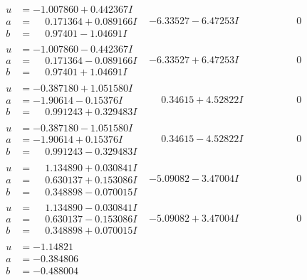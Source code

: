 \documentclass[1p]{elsarticle_modified}
\theoremstyle{definition}
\begin{document}
$$\begin{array}{c|c|c}
\begin{aligned}
u &= -1.007860 + 0.442367 I \\
a &= \phantom{-}0.171364 + 0.089166 I \\
b &= \phantom{-}0.97401 - 1.04691 I\end{aligned}
 & -6.33527 - 6.47253 I & \phantom{-0.000000 } 0 \\ \hline\begin{aligned}
u &= -1.007860 - 0.442367 I \\
a &= \phantom{-}0.171364 - 0.089166 I \\
b &= \phantom{-}0.97401 + 1.04691 I\end{aligned}
 & -6.33527 + 6.47253 I & \phantom{-0.000000 } 0 \\ \hline\begin{aligned}
u &= -0.387180 + 1.051580 I \\
a &= -1.90614 - 0.15376 I \\
b &= \phantom{-}0.991243 + 0.329483 I\end{aligned}
 & \phantom{-}0.34615 + 4.52822 I & \phantom{-0.000000 } 0 \\ \hline\begin{aligned}
u &= -0.387180 - 1.051580 I \\
a &= -1.90614 + 0.15376 I \\
b &= \phantom{-}0.991243 - 0.329483 I\end{aligned}
 & \phantom{-}0.34615 - 4.52822 I & \phantom{-0.000000 } 0 \\ \hline\begin{aligned}
u &= \phantom{-}1.134890 + 0.030841 I \\
a &= \phantom{-}0.630137 + 0.153086 I \\
b &= \phantom{-}0.348898 - 0.070015 I\end{aligned}
 & -5.09082 - 3.47004 I & \phantom{-0.000000 } 0 \\ \hline\begin{aligned}
u &= \phantom{-}1.134890 - 0.030841 I \\
a &= \phantom{-}0.630137 - 0.153086 I \\
b &= \phantom{-}0.348898 + 0.070015 I\end{aligned}
 & -5.09082 + 3.47004 I & \phantom{-0.000000 } 0 \\ \hline\begin{aligned}
u &= -1.14821\phantom{ +0.000000I} \\
a &= -0.384806\phantom{ +0.000000I} \\
b &= -0.488004\phantom{ +0.000000I}\end{aligned}

\end{array}$$
\end{document}
